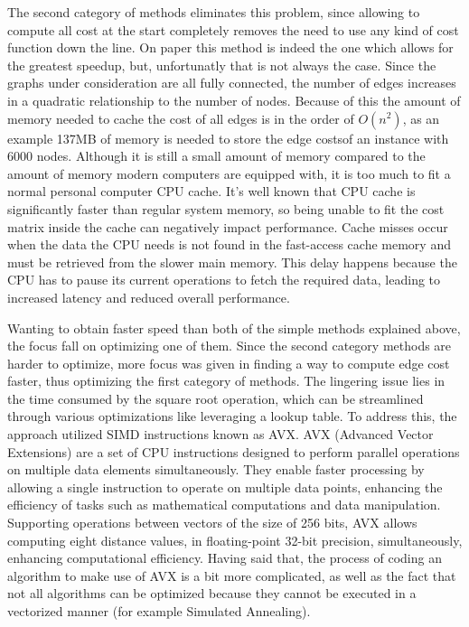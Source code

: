 The second category of methods eliminates this problem, since allowing to compute all cost at the start completely removes the need to use any kind of cost function down the line.
On paper this method is indeed the one which allows for the greatest speedup, but, unfortunatly that is not always the case.
Since the graphs under consideration are all fully connected, the number of edges increases in a quadratic relationship to the number of nodes.
Because of this the amount of memory needed to cache the cost of all edges is in the order of $O(n^2)$, as an example 137MB of memory is needed to store the edge costsof an instance with 6000 nodes.
Although it is still a small amount of memory compared to the amount of memory modern computers are equipped with, it is too much to fit a normal personal computer CPU cache.
It's well known that CPU cache is significantly faster than regular system memory, so being unable to fit the cost matrix inside the cache can negatively impact performance.
Cache misses occur when the data the CPU needs is not found in the fast-access cache memory and must be retrieved from the slower main memory.
This delay happens because the CPU has to pause its current operations to fetch the required data, leading to increased latency and reduced overall performance.

Wanting to obtain faster speed than both of the simple methods explained above, the focus fall on optimizing one of them.
Since the second category methods are harder to optimize, more focus was given in finding a way to compute edge cost faster, thus optimizing the first category of methods.
The lingering issue lies in the time consumed by the square root operation, which can be streamlined through various optimizations like leveraging a lookup table.
To address this, the approach utilized SIMD instructions known as AVX.
AVX (Advanced Vector Extensions) are a set of CPU instructions designed to perform parallel operations on multiple data elements simultaneously.
They enable faster processing by allowing a single instruction to operate on multiple data points, enhancing the efficiency of tasks such as mathematical computations and data manipulation.
Supporting operations between vectors of the size of 256 bits, AVX allows computing eight distance values, in floating-point 32-bit precision, simultaneously, enhancing computational efficiency.
Having said that, the process of coding an algorithm to make use of AVX is a bit more complicated, as well as the fact that not all algorithms can be optimized because they cannot be executed in a vectorized manner (for example Simulated Annealing).

